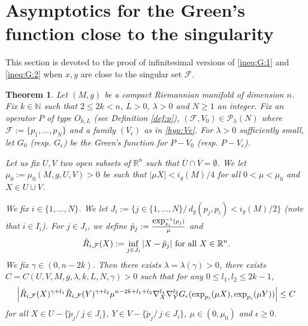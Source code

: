 \documentclass[reqno]{amsart}
\newtheorem{theorem}{Theorem}[section]
\def \rn {\mathbb{R}^n}
\def \nn {\mathbb{N}}
\def \eps {\epsilon}
\def \Pl {{\mathcal P}_\lambda}
\def \F {{\mathcal F}}
\begin{document}
\section{Asymptotics for the Green's function close to the singularity}\label{sec:green2}
This section is devoted to the proof of infinitesimal versions of \eqref{ineq:G:1} and \eqref{ineq:G:2} when  $x,y$ are close to the singular set $\F$.

\begin{theorem}\label{th:G:close} Let $(M,g)$ be a compact Riemannian manifold of dimension $n$. Fix $k\in\nn$ such that $2\leq 2k<n$, $L>0$, $\lambda>0$ and $N\geq 1$ an integer. Fix an operator $P$ of type $O_{k,L}$ (see Definition \ref{def:p}), $(\F,V_0)\in \Pl(N)$ where $\F:=\{p_1,...,p_N\}$ and a family $(V_\eps)$ as in \eqref{hyp:Ve}. For $\lambda>0$ sufficiently small, let $G_0$ (resp. $G_\eps$) be the Green's function for $P-V_0$ (resp. $P-V_\eps$). 

\smallskip\noindent Let us fix $U, V$ two open subsets of $\rn$ such that $ \overline{U}\cap\overline{V}=\emptyset$. We let $\mu_0:=\mu_0(M,g,U,V)>0$ be such that $|\mu X|<i_g(M)/4$ for all $0<\mu<\mu_0$ and $X\in U\cup V$.  

\smallskip\noindent We fix $i\in\{1,...,N\}$. We let $J_i:=\{j\in \{1,...,N\}/\, d_g(p_j,p_i)<i_g(M)/2\}$ (note that $i\in I_i$). For $j\in J_i$, we define $\tilde{p}_{j}:=\frac{\hbox{exp}_{p_i}^{-1}(p_j)}{\mu}$ and 
$$\tilde{R}_{i,\F}(X):=\inf_{j\in J_i}|X-\tilde{p}_j|\hbox{ for all }X\in\rn.$$
We fix $\gamma\in (0, n-2k)$. Then there exists $\lambda=\lambda(\gamma)>0$, there exists $C=C(U,V, M,g,\lambda, k, L,N,\gamma)>0$ such that for any $0\leq l_1,l_2\leq 2k-1$, 
\begin{equation}\label{ineq:G:close}
\left| \tilde{R}_{i,\F}(X)^{\gamma+l_1} \tilde{R}_{i,\F}(Y)^{\gamma+l_2} \mu^{n-2k+l_1+l_2}\nabla_X^{l_1}\nabla_Y^{l_2}G_\eps( \hbox{exp}_{p_i}(\mu X),\hbox{exp}_{p_i}(\mu Y) )\right|\leq C
\end{equation}
for all $X\in U-\{\tilde{p}_j/\, j\in J_i\}$, $Y\in V-\{\tilde{p}_j/\, j\in J_i\}$, $\mu\in (0,\mu_0)$ and $\eps\geq 0$.
\end{theorem}
\end{document}
